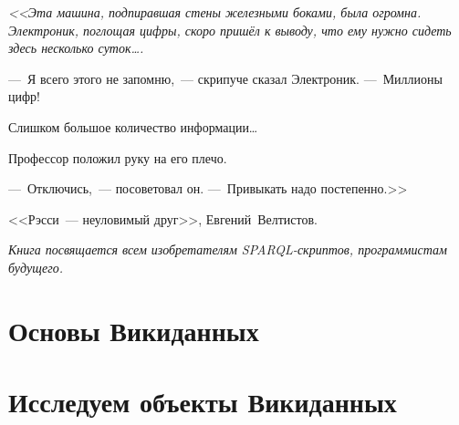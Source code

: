 \documentclass[nofonts,justified,nobib]{tufte-book}%
\theoremstyle{definition}
\begin{document}
\begin{fullwidth}
\begin{doublespace}
\noindent\fontsize{18}{22}\selectfont\itshape
<<Эта машина, подпиравшая стены железными боками, была огромна. 
Электроник, поглощая цифры, скоро пришёл к выводу, что ему нужно сидеть здесь несколько суток\dots.

---~Я всего этого не запомню,~--- скрипуче сказал Электроник. ---~Миллионы цифр!

Слишком большое количество информации\dots

Профессор положил руку на его плечо.

---~Отключись,~--- посоветовал он. ---~Привыкать надо постепенно.>>

<<Рэсси~--- неуловимый друг>>, \mbox{Евгений Велтистов}.
\end{doublespace}
\end{fullwidth}


\begin{fullwidth}
\begin{doublespace}
\noindent\fontsize{18}{22}\selectfont\itshape
\nohyphenation
Книга посвящается всем изобретателям SPARQL-скриптов, 
    программистам будущего.
\end{doublespace}
\end{fullwidth}


\cleardoublepage



\mainmatter

\part{Основы Викиданных}










\part{Исследуем объекты Викиданных}













\end{document}
